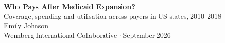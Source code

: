 \documentclass[final]{article}
\begin{document}
\begin{center}
  {\fontsize{86}{98}\selectfont\bfseries Who Pays After Medicaid Expansion?}\\[7mm]
  {\fontsize{42}{52}\selectfont\color{WarmGray} Coverage, spending and utilisation across payers in US states, 2010--2018}\\[10mm]
  {\fontsize{36}{44}\selectfont Emily Johnson}\\[4mm]
  {\fontsize{27}{35}\selectfont\color{WarmGray} Wennberg International Collaborative $\cdot$ September 2026}
\end{center}
\vspace{7mm}{\color{Treat}\rule{\textwidth}{4pt}}\vspace{9mm}

\noindent
\end{document}
